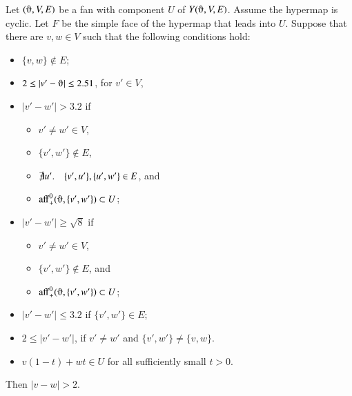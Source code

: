 \begin{lemma}
Let $(\orgn,V,E)$ be a fan with component $U$ of
$Y(\orgn,V,E)$.  Assume the hypermap is cyclic. 
Let $F$ be the simple face of the hypermap
that leads into $U$.   Suppose that there are $v,w\in V$ such that
the following conditions hold:
\begin{itemize}
 \item $\{v,w\}\not\in E$;
 \item $2\le |v'-\orgn| \le 2.51$, for $v'\in V$,
 \item $|v'-w'|> 3.2$ if
    \begin{itemize}
       \item $v'\ne w'\in V$,
       \item $\{v',w'\}\not\in E$,
       \item $\not\exists u'.\quad \{v',u'\}, \{u',w'\}\in E$, and
       \item $\op{aff}_+^0(\orgn,\{v',w'\})\subset U$;
    \end{itemize}
 \item $|v'-w'|\ge \sqrt8$ if
    \begin{itemize}
      \item $v'\ne w'\in V$,
      \item $\{v',w'\}\not\in E$, and
      \item $\op{aff}_+^0(\orgn,\{v',w'\})\subset U$;
    \end{itemize}
 \item $|v'-w'|\le 3.2$ if $\{v',w'\}\in E$;
 \item $2\le |v'-w'|$, if $v'\ne w'$ and $\{v',w'\}\ne \{v,w\}$.
 \item $v(1-t) + w t \in U$ for all sufficiently small $t>0$.
\end{itemize}
Then $|v-w|>2$.
\end{lemma}


